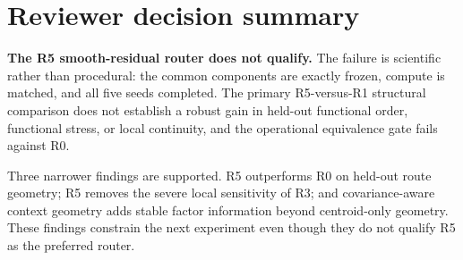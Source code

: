 \documentclass[11pt,a4paper]{article}
\begin{document}
\section{Reviewer decision summary}
\begin{criticalbox}
\textbf{The R5 smooth-residual router does not qualify.} The failure is scientific rather than procedural: the common components are exactly frozen, compute is matched, and all five seeds completed. The primary R5-versus-R1 structural comparison does not establish a robust gain in held-out functional order, functional stress, or local continuity, and the operational equivalence gate fails against R0.
\end{criticalbox}

\begin{positivebox}
Three narrower findings are supported. R5 outperforms R0 on held-out route geometry; R5 removes the severe local sensitivity of R3; and covariance-aware context geometry adds stable factor information beyond centroid-only geometry. These findings constrain the next experiment even though they do not qualify R5 as the preferred router.
\end{positivebox}
\end{document}
